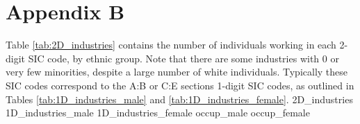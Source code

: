 \documentclass[class=article, crop=false]{standalone}
\begin{document}
\section{Appendix B}
\label{sec:appendixB}
Table \ref{tab:2D_industries} contains the number of individuals working in each 2-digit SIC code, by ethnic group. Note that there are some industries with 0 or very few minorities, despite a large number of white individuals. Typically these SIC codes correspond to the A:B or C:E sections 1-digit SIC codes, as outlined in Tables \ref{tab:1D_industries_male} and \ref{tab:1D_industries_female}. 
{2D_industries}
\restoregeometry
{1D_industries_male}
{1D_industries_female}
{occup_male} %
{occup_female} %

\ifstandalone

\fi
\end{document}
